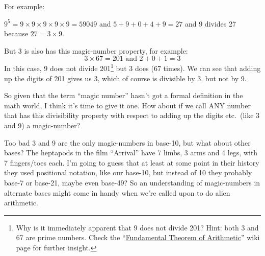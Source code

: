 \documentclass{article}
\newenvironment{jprIn}{\begin{adjustwidth}{2em}{}}{\end{adjustwidth}}
\begin{document}
For example:
\begin{jprIn}
$9^5=9\times{}9\times{}9\times{}9\times{}9=59049$
and $5+9+0+4+9=27$ and 9 divides 27 because $27 = 3\times{}9$.
\end{jprIn}

But 3 is also has this magic-number property, for example:
\[ 3\times{}67=201 \text{ and } 2+0+1=3\]
In this case, 9 does not divide 201\footnote{Why is it immediately
apparent that 9 does not divide 201? Hint: both 3 and 67 are prime numbers.
Check the ``\href{https://en.wikipedia.org/wiki/Fundamental_theorem_of_arithmetic}{Fundamental
Theorem of Arithmetic}'' wiki page for further insight.}
but 3 does (67 times).
We can see that adding up the digits of 201 gives us 3,
which of course is divisible by 3, but not by 9.

So given that the term ``magic number'' hasn't got
a formal definition in the math world, I think it's time to give it one.
How about if we call ANY number that has this
divisibility property with respect to adding up the digits etc.\ (like 3 and 9) a magic-number?

Too bad 3 and 9 are the only magic-numbers in base-10,
but what about other bases?
The heptapods in the film ``Arrival'' have 7 limbs, 3 arms and 4 legs, with 7 fingers/toes each.
I'm going to guess that at least at some point in their history they used positional
notation, like our base-10, but instead of 10 they probably base-7 or base-21,
maybe even base-49? So an understanding of magic-numbers in alternate
bases might come in handy when we're called upon to do alien arithmetic.
\end{document}
